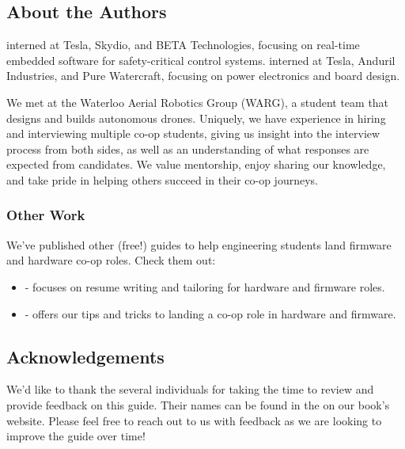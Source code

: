 \documentclass[main.tex]{subfiles}
\begin{document}
\subsection{About the Authors}
 interned at Tesla, Skydio, and BETA Technologies, focusing on real-time embedded software for safety-critical control systems.
\newline
\newline
{} interned at Tesla, Anduril Industries, and Pure Watercraft, focusing on power electronics and board design. \newline

\newnoindentpara We met at the Waterloo Aerial Robotics Group (WARG), a student team that designs and builds autonomous drones. Uniquely, we have experience in hiring and interviewing multiple co-op students, giving us insight into the interview process from both sides, as well as an understanding of what responses are expected from candidates. We value mentorship, enjoy sharing our knowledge, and take pride in helping others succeed in their co-op journeys.

\subsubsection{Other Work}
We've published other (free!) guides to help engineering students land firmware and hardware co-op roles. Check them out:
\begin{itemize}
    \item {} - focuses on resume writing and tailoring for hardware and firmware roles.
    \item {} - offers our tips and tricks to landing a co-op role in hardware and firmware.
\end{itemize}

\subsection{Acknowledgements}
We'd like to thank the several individuals for taking the time to review and provide feedback on this guide. Their names can be found in the  on our book's website. Please feel free to reach out to us with feedback as we are looking to improve the guide over time!
\end{document}
